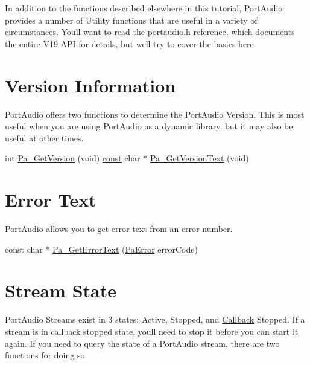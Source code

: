 In addition to the functions described elsewhere in this tutorial, Port\+Audio provides a number of Utility functions that are useful in a variety of circumstances. You\textquotesingle{}ll want to read the \hyperlink{portaudio_8h}{portaudio.\+h} reference, which documents the entire V19 A\+PI for details, but we\textquotesingle{}ll try to cover the basics here.\hypertarget{utility_functions_tut_util2}{}\section{Version Information}\label{utility_functions_tut_util2}
Port\+Audio offers two functions to determine the Port\+Audio Version. This is most useful when you are using Port\+Audio as a dynamic library, but it may also be useful at other times.


\begin{DoxyCode}
\textcolor{keywordtype}{int}             \hyperlink{portaudio_8h_a66da08bcf908e0849c62a6b47f50d7b4}{Pa\_GetVersion} (\textcolor{keywordtype}{void})
\hyperlink{getopt_8c_a2c212835823e3c54a8ab6d95c652660e}{const} \textcolor{keywordtype}{char} *    \hyperlink{portaudio_8h_a28f3fd9e6d9f933cc695abea71c4b445}{Pa\_GetVersionText} (\textcolor{keywordtype}{void})
\end{DoxyCode}
\hypertarget{utility_functions_tut_util3}{}\section{Error Text}\label{utility_functions_tut_util3}
Port\+Audio allows you to get error text from an error number.


\begin{DoxyCode}
\textcolor{keyword}{const} \textcolor{keywordtype}{char} *    \hyperlink{portaudio_8h_ae606855a611cf29c7d2d7421df5e3b5d}{Pa\_GetErrorText} (\hyperlink{portaudio_8h_a4949e4a8ef9f9dbe8cbee414ce69841d}{PaError} errorCode)
\end{DoxyCode}
\hypertarget{utility_functions_tut_util4}{}\section{Stream State}\label{utility_functions_tut_util4}
Port\+Audio Streams exist in 3 states\+: Active, Stopped, and \hyperlink{class_callback}{Callback} Stopped. If a stream is in callback stopped state, you\textquotesingle{}ll need to stop it before you can start it again. If you need to query the state of a Port\+Audio stream, there are two functions for doing so\+:


